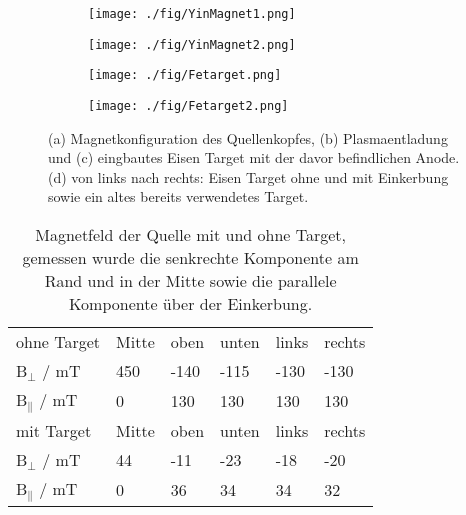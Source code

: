 \begin{figure}
    \centering
    \begin{subfigure}{0.33\textwidth}
        \texttt{[image: ./fig/YinMagnet1.png]}
        \caption{}
        \label{fig:magnet}
    \end{subfigure}
    \begin{subfigure}{0.33\textwidth}
        \texttt{[image: ./fig/YinMagnet2.png]}
        \caption{}
        \label{fig:plasma}
    \end{subfigure}
    \begin{subfigure}{0.30\textwidth}
        \texttt{[image: ./fig/Fetarget.png]}
        \caption{}
        \label{fig:target1}
    \end{subfigure}
    \begin{subfigure}{1\textwidth}
        \texttt{[image: ./fig/Fetarget2.png]}
        \caption{}
        \label{fig:target2}
    \end{subfigure}
    \caption{(a) Magnetkonfiguration des Quellenkopfes, (b) Plasmaentladung \cite{Yin.2007} und (c) eingbautes Eisen Target mit der davor befindlichen Anode. (d) von links nach rechts: Eisen Target ohne und mit Einkerbung sowie ein altes bereits verwendetes Target.}
    \label{fig:target}
\end{figure}
\begin{table}
    \centering
    \caption{Magnetfeld der Quelle mit und ohne Target, gemessen wurde die senkrechte Komponente am Rand und in der Mitte sowie die parallele Komponente über der Einkerbung.}
    \label{tab:bfeld}
    \begin{tabular}{l|lllll}
        \toprule
        ohne Target	&	Mitte	&	oben	&	unten	&  links & rechts\\
        B$_{\bot}$ / mT   & 450 &-140 & -115& -130& -130 \\
        B$_{\parallel}$ / mT   & 0 &130 & 130& 130& 130 \\    
        \midrule
        mit Target	&	Mitte	&	oben	&	unten	&  links & rechts\\
        B$_{\bot}$ / mT   & 44 &-11 & -23& -18& -20 \\
        B$_{\parallel}$ / mT   & 0 &36 & 34& 34& 32 \\      
       \bottomrule
    \end{tabular}
  \end{table}

